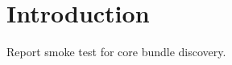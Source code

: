 \documentclass{report}
\begin{document}
\chapter{Introduction}
Report smoke test for core bundle discovery.
\end{document}
